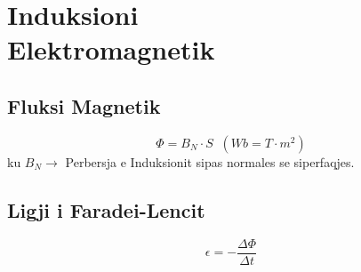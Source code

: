 \documentclass[a4paper, twocolumn]{article}
\begin{document}
\section{Induksioni \\Elektromagnetik}
\subsection{Fluksi Magnetik}
\[
	\Phi = B_{N}\cdot S \;\; (Wb = T\cdot m^2)
\] 
ku $B_{N} \to$ Perbersja e Induksionit sipas normales se siperfaqjes.
\subsection{Ligji i Faradei-Lencit}
\[
	\epsilon = -\frac{\Delta \Phi}{\Delta t}
\] 
\end{document}
